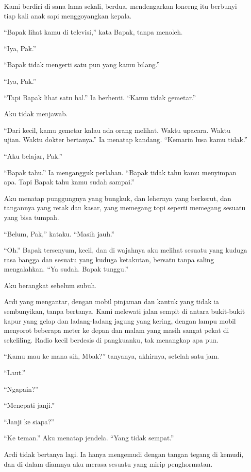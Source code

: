 \documentclass[11pt,twoside,openany]{book}
\makeatletter
\newcommand{\scenebreak}{\par\vspace{0.9em}{\centering\textsc{*\hspace{0.7em}*\hspace{0.7em}*}\par}\vspace{0.9em}\@afterindentfalse\@afterheading}
\makeatother
\begin{document}
Kami berdiri di sana lama sekali, berdua, mendengarkan lonceng itu berbunyi tiap kali anak sapi menggoyangkan kepala.

``Bapak lihat kamu di televisi,'' kata Bapak, tanpa menoleh.

``Iya, Pak.''

``Bapak tidak mengerti satu pun yang kamu bilang.''

``Iya, Pak.''

``Tapi Bapak lihat satu hal.'' Ia berhenti. ``Kamu tidak gemetar.''

Aku tidak menjawab.

``Dari kecil, kamu gemetar kalau ada orang melihat. Waktu upacara. Waktu ujian. Waktu dokter bertanya.'' Ia menatap kandang. ``Kemarin lusa kamu tidak.''

``Aku belajar, Pak.''

``Bapak tahu.'' Ia mengangguk perlahan. ``Bapak tidak tahu kamu menyimpan apa. Tapi Bapak tahu kamu sudah sampai.''

Aku menatap punggungnya yang bungkuk, dan lehernya yang berkerut, dan tangannya yang retak dan kasar, yang memegang topi seperti memegang sesuatu yang bisa tumpah.

``Belum, Pak,'' kataku. ``Masih jauh.''

``Oh.'' Bapak tersenyum, kecil, dan di wajahnya aku melihat sesuatu yang kuduga rasa bangga dan sesuatu yang kuduga ketakutan, bersatu tanpa saling mengalahkan. ``Ya sudah. Bapak tunggu.''

\scenebreak
Aku berangkat sebelum subuh.

Ardi yang mengantar, dengan mobil pinjaman dan kantuk yang tidak ia sembunyikan, tanpa bertanya. Kami melewati jalan sempit di antara bukit-bukit kapur yang gelap dan ladang-ladang jagung yang kering, dengan lampu mobil menyorot beberapa meter ke depan dan malam yang masih sangat pekat di sekeliling. Radio kecil berdesis di pangkuanku, tak menangkap apa pun.

``Kamu mau ke mana sih, Mbak?'' tanyanya, akhirnya, setelah satu jam.

``Laut.''

``Ngapain?''

``Menepati janji.''

``Janji ke siapa?''

``Ke teman.'' Aku menatap jendela. ``Yang tidak sempat.''

Ardi tidak bertanya lagi. Ia hanya mengemudi dengan tangan tegang di kemudi, dan di dalam diamnya aku merasa sesuatu yang mirip penghormatan.
\end{document}
